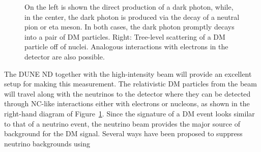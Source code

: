 \begin{figure}[!htb]
\begin{minipage}[c]{0.3\textwidth}
\begin{center}
{
}
    \end{center}
  \end{minipage}
  \begin{minipage}[c]{0.3\textwidth}
    \begin{center}
    \end{center}
  \end{minipage}
\caption[Production mechanisms for dark matter at neutrino-beam
experiments] {On the left is shown the direct production of a dark
  photon, while, in the center, the dark photon is produced via the
  decay of a neutral pion or eta meson. In both cases, the dark photon
  promptly decays into a pair of DM particles. Right: Tree-level
  scattering of a DM particle off of nuclei. Analogous interactions
  with electrons in the detector are also possible.}
\label{fig:dm}
\end{figure}
The DUNE ND together with the  high-intensity beam will provide an excellent setup for making this
measurement. The relativistic DM particles from the beam will travel along with
the neutrinos to the %
detector where they %
can  be detected through NC-like interactions either with
electrons or nucleons, %
as shown in the right-hand diagram of 
Figure~\ref{fig:dm}.  Since the signature of a DM event looks similar to that of
a neutrino event, the neutrino beam provides the major source of
background for the DM signal. %
Several ways have been proposed to suppress neutrino backgrounds using
